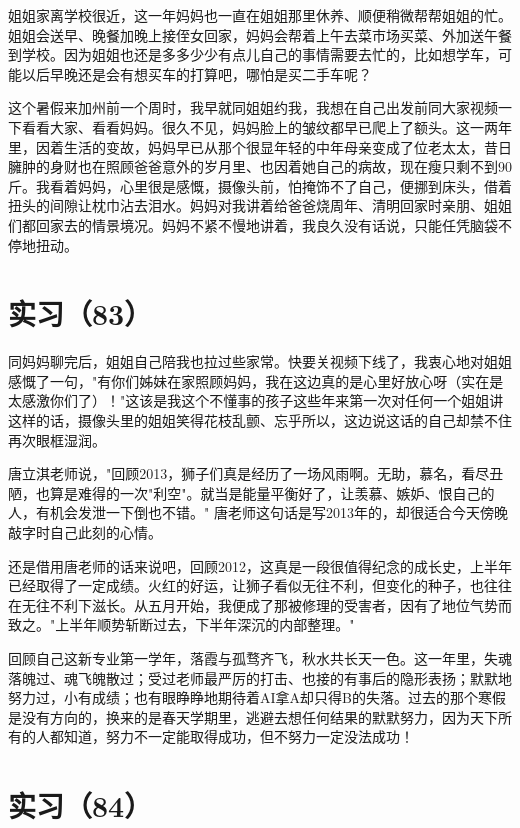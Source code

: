 \documentclass[12pt]{book}
\begin{document}
姐姐家离学校很近，这一年妈妈也一直在姐姐那里休养、顺便稍微帮帮姐姐的忙。姐姐会送早、晚餐加晚上接侄女回家，妈妈会帮着上午去菜市场买菜、外加送午餐到学校。因为姐姐也还是多多少少有点儿自己的事情需要去忙的，比如想学车，可能以后早晚还是会有想买车的打算吧，哪怕是买二手车呢？

这个暑假来加州前一个周时，我早就同姐姐约我，我想在自己出发前同大家视频一下看看大家、看看妈妈。很久不见，妈妈脸上的皱纹都早已爬上了额头。这一两年里，因着生活的变故，妈妈早已从那个很显年轻的中年母亲变成了位老太太，昔日臃肿的身财也在照顾爸爸意外的岁月里、也因着她自己的病故，现在瘦只剩不到90斤。我看着妈妈，心里很是感慨，摄像头前，怕掩饰不了自己，便挪到床头，借着扭头的间隙让枕巾沾去泪水。妈妈对我讲着给爸爸烧周年、清明回家时亲朋、姐姐们都回家去的情景境况。妈妈不紧不慢地讲着，我良久没有话说，只能任凭脑袋不停地扭动。


\section{实习（83）　}
\label{sec-5-86}

同妈妈聊完后，姐姐自己陪我也拉过些家常。快要关视频下线了，我衷心地对姐姐感慨了一句，"有你们姊妹在家照顾妈妈，我在这边真的是心里好放心呀（实在是太感激你们了）！"这该是我这个不懂事的孩子这些年来第一次对任何一个姐姐讲这样的话，摄像头里的姐姐笑得花枝乱颤、忘乎所以，这边说这话的自己却禁不住再次眼框湿润。

唐立淇老师说，"回顾2013，狮子们真是经历了一场风雨啊。无助，慕名，看尽丑陋，也算是难得的一次"利空"。就当是能量平衡好了，让羡慕、嫉妒、恨自己的人，有机会发泄一下倒也不错。" 唐老师这句话是写2013年的，却很适合今天傍晚敲字时自己此刻的心情。

还是借用唐老师的话来说吧，回顾2012，这真是一段很值得纪念的成长史，上半年已经取得了一定成绩。火红的好运，让狮子看似无往不利，但变化的种子，也往往在无往不利下滋长。从五月开始，我便成了那被修理的受害者，因有了地位气势而致之。"上半年顺势斩断过去，下半年深沉的内部整理。"

回顾自己这新专业第一学年，落霞与孤骛齐飞，秋水共长天一色。这一年里，失魂落魄过、魂飞魄散过；受过老师最严厉的打击、也接的有事后的隐形表扬；默默地努力过，小有成绩；也有眼睁睁地期待着AI拿A却只得B的失落。过去的那个寒假是没有方向的，换来的是春天学期里，逃避去想任何结果的默默努力，因为天下所有的人都知道，努力不一定能取得成功，但不努力一定没法成功！


\section{实习（84）}
\label{sec-5-87}
\end{document}

